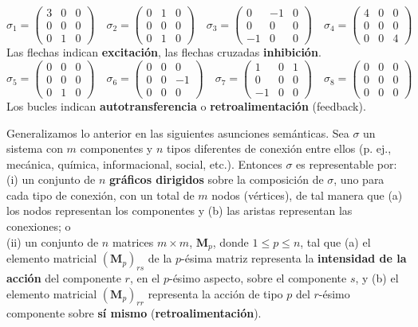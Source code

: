 {\fontsize{13}{15}\selectfont
$$ \sigma_1 = \begin{pmatrix}
3 & 0 & 0 \\
0 & 0 & 0 \\
0 & 1 & 0 
\end{pmatrix} \quad
\sigma_2 = \begin{pmatrix}
0 & 1 & 0 \\
0 & 0 & 0 \\
0 & 1 & 0 
\end{pmatrix} \quad
\sigma_3 = \begin{pmatrix}
0 & -1 & 0 \\
0 & 0 & 0 \\
-1 & 0 & 0 
\end{pmatrix} \quad
\sigma_4 = \begin{pmatrix}
4 & 0 & 0 \\
0 & 0 & 0 \\
0 & 0 & 4 
\end{pmatrix} $$
Las flechas indican \textbf{excitación}, las flechas cruzadas \textbf{inhibición}.
$$ \sigma_5 = \begin{pmatrix}
0 & 0 & 0 \\
0 & 0 & 0 \\
0 & 1 & 0 
\end{pmatrix} \quad
\sigma_6 = \begin{pmatrix}
0 & 0 & 0 \\
0 & 0 & -1 \\
0 & 0 & 0 
\end{pmatrix} \quad
\sigma_7 = \begin{pmatrix}
1 & 0 & 1 \\
0 & 0 & 0 \\
-1 & 0 & 0 
\end{pmatrix} \quad
\sigma_8 = \begin{pmatrix}
0 & 0 & 0 \\
0 & 0 & 0 \\
0 & 0 & 0 
\end{pmatrix} $$
Los bucles indican \textbf{autotransferencia} o \textbf{retroalimentación} (feedback).

Generalizamos lo anterior en las siguientes asunciones semánticas. Sea $\sigma$ un sistema con $m$ componentes y $n$ tipos diferentes de conexión entre ellos (p. ej., mecánica, química, informacional, social, etc.). Entonces $\sigma$ es representable por:\\

(i) un conjunto de $n$ \textbf{gráficos dirigidos} sobre la composición de $\sigma$, uno para cada tipo de conexión, con un total de $m$ nodos (vértices), de tal manera que (a) los nodos representan los componentes y (b) las aristas representan las conexiones; o
\\ (ii) un conjunto de $n$ matrices $m \times m$, $\mathbf{M}_p$, donde $1 \le p \le n$, tal que (a) el elemento matricial $(\mathbf{M}_p)_{rs}$ de la $p$-ésima matriz representa la \textbf{intensidad de la acción} del componente $r$, en el $p$-ésimo aspecto, sobre el componente $s$, y (b) el elemento matricial $(\mathbf{M}_p)_{rr}$ representa la acción de tipo $p$ del $r$-ésimo componente sobre \textbf{sí mismo} (\textbf{retroalimentación}).
\\

}
